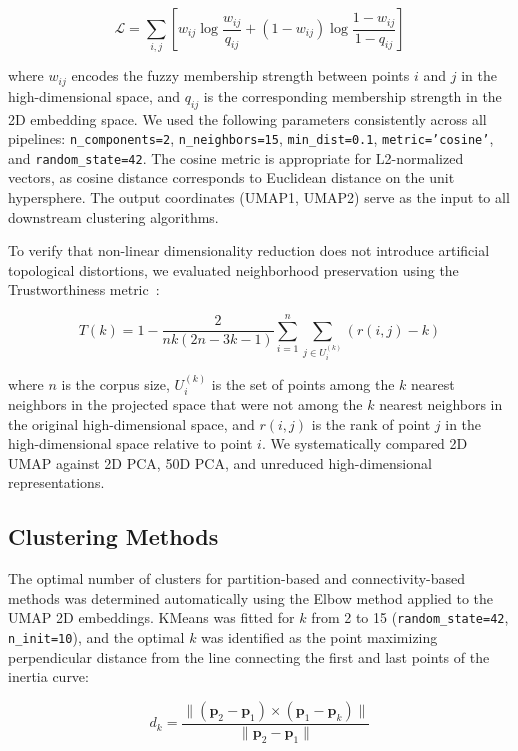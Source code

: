 \documentclass[a4paper,10pt,conference]{IEEEtran}
\begin{document}
\begin{equation}
\mathcal{L} = \sum_{i,j} \left[ w_{ij} \log \frac{w_{ij}}{q_{ij}} + (1 - w_{ij}) \log \frac{1 - w_{ij}}{1 - q_{ij}} \right]
\end{equation}

where $w_{ij}$ encodes the fuzzy membership strength between points $i$ and $j$ in the high-dimensional space, and $q_{ij}$ is the corresponding membership strength in the 2D embedding space. We used the following parameters consistently across all pipelines: \texttt{n\_components=2}, \texttt{n\_neighbors=15}, \texttt{min\_dist=0.1}, \texttt{metric='cosine'}, and \texttt{random\_state=42}. The cosine metric is appropriate for L2-normalized vectors, as cosine distance corresponds to Euclidean distance on the unit hypersphere. The output coordinates (UMAP1, UMAP2) serve as the input to all downstream clustering algorithms.

To verify that non-linear dimensionality reduction does not introduce artificial topological distortions, we evaluated neighborhood preservation using the Trustworthiness metric~\cite{ref34}:

\begin{equation}
T(k) = 1 - \frac{2}{n k (2n - 3k - 1)} \sum_{i=1}^n \sum_{j \in U_i^{(k)}} (r(i,j) - k)
\end{equation}

where $n$ is the corpus size, $U_i^{(k)}$ is the set of points among the $k$ nearest neighbors in the projected space that were not among the $k$ nearest neighbors in the original high-dimensional space, and $r(i,j)$ is the rank of point $j$ in the high-dimensional space relative to point $i$. We systematically compared 2D UMAP against 2D PCA, 50D PCA, and unreduced high-dimensional representations.

\subsection{Clustering Methods}

The optimal number of clusters for partition-based and connectivity-based methods was determined automatically using the Elbow method applied to the UMAP 2D embeddings. KMeans was fitted for $k$ from 2 to 15 (\texttt{random\_state=42}, \texttt{n\_init=10}), and the optimal $k$ was identified as the point maximizing perpendicular distance from the line connecting the first and last points of the inertia curve:

\begin{equation}
d_k = \frac{\| (\mathbf{p}_2 - \mathbf{p}_1) \times (\mathbf{p}_1 - \mathbf{p}_k) \|}{\| \mathbf{p}_2 - \mathbf{p}_1 \|}
\end{equation}
\end{document}
